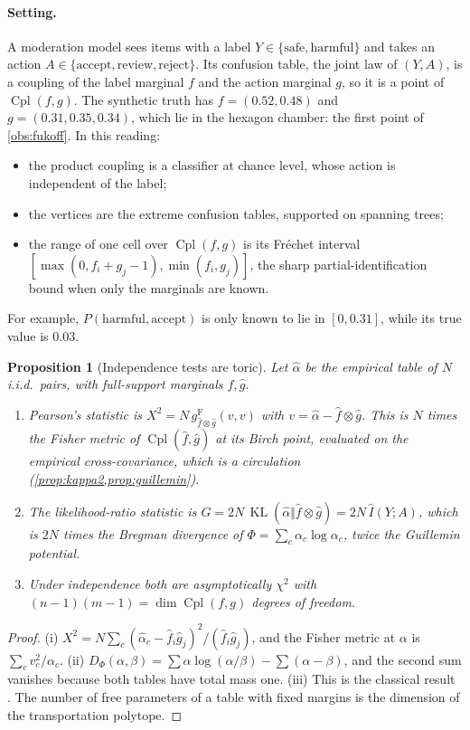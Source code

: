 \documentclass[11pt]{article}
\newtheorem{proposition}[theorem]{Proposition}
\theoremstyle{definition}
\theoremstyle{remark}
\newcommand{\Cpl}{\operatorname{Cpl}}
\begin{document}
\paragraph{Setting.} A moderation model sees items with a label $Y\in\{\text{safe},\text{harmful}\}$ and takes an action
$A\in\{\text{accept},\text{review},\text{reject}\}$. Its confusion table, the joint law of $(Y,A)$, is a coupling of the label
marginal $f$ and the action marginal $g$, so it is a point of $\Cpl(f,g)$. The synthetic truth has $f=(0.52,0.48)$ and
$g=(0.31,0.35,0.34)$, which lie in the hexagon chamber: the first point of \cref{obs:fukoff}. In this reading:
\begin{itemize}[leftmargin=*]
\item the product coupling is a classifier at chance level, whose action is independent of the label;
\item the vertices are the extreme confusion tables, supported on spanning trees;
\item the range of one cell over $\Cpl(f,g)$ is its Fr\'echet interval $[\max(0,f_i+g_j-1),\min(f_i,g_j)]$, the sharp
  partial-identification bound when only the marginals are known.
\end{itemize}
For example, $P(\text{harmful},\text{accept})$ is only known to lie in $[0,0.31]$, while its true value is $0.03$.

\begin{proposition}[Independence tests are toric]\label{prop:indeptests}
Let $\hat\alpha$ be the empirical table of $N$ i.i.d.\ pairs, with full-support marginals $\hat f,\hat g$.
\begin{enumerate}[label=(\roman*)]
\item Pearson's statistic is $X^2=N\,g^{\mathrm F}_{\hat f\otimes\hat g}(v,v)$ with $v=\hat\alpha-\hat f\otimes\hat g$. This is $N$ times the Fisher
  metric of $\Cpl(\hat f,\hat g)$ at its Birch point, evaluated on the empirical cross-covariance, which is a circulation
  (\cref{prop:kappa2,prop:guillemin}).
\item The likelihood-ratio statistic is $G=2N\,\operatorname{KL}(\hat\alpha\Vert\hat f\otimes\hat g)=2N\,\hat I(Y;A)$, which is $2N$ times the
  Bregman divergence of $\Phi=\sum_c\alpha_c\log\alpha_c$, twice the Guillemin potential.
\item Under independence both are asymptotically $\chi^2$ with $(n-1)(m-1)=\dim\Cpl(f,g)$ degrees of freedom.
\end{enumerate}
\end{proposition}
\begin{proof}
(i) $X^2=N\sum_c(\hat\alpha_c-\hat f_i\hat g_j)^2/(\hat f_i\hat g_j)$, and the Fisher metric at $\alpha$ is $\sum_cv_c^2/\alpha_c$.
(ii) $D_\Phi(\alpha,\beta)=\sum\alpha\log(\alpha/\beta)-\sum(\alpha-\beta)$, and the second sum vanishes because both tables have total
mass one. (iii) This is the classical result \cite{Agresti2013}. The number of free parameters of a table with fixed
margins is the dimension of the transportation polytope.
\end{proof}
\end{document}
